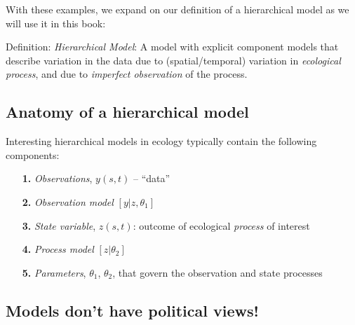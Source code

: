 With these examples, 
we expand on our definition of a hierarchical model as we will use it in this book:

\vspace{.1in}

{\flushleft Definition: {\it Hierarchical Model}: A model with
  explicit component models that describe variation in the data due to
  (spatial/temporal) variation in {\it ecological process}, and due to
  {\it imperfect observation} of the process.  
}


\subsection{Anatomy of a hierarchical model}

Interesting hierarchical models in ecology typically 
contain the following components:
\begin{itemize}
\item[{\bf 1.}] {\it Observations}, $y(s,t)$ -- ``data''
\item[{\bf 2.}] {\it Observation model} $[y|z,\theta_1]$
\item[{\bf 3.}] {\it State variable}, $z(s,t)$: outcome of ecological {\it process} of interest
\item[{\bf 4.}] {\it Process model}  $[z|\theta_2]$ 
\item[{\bf 5.}] {\it Parameters}, $\theta_1$, $\theta_2$, that govern
  the observation and state processes
\end{itemize}


\subsection{Models don't have political views!} 

